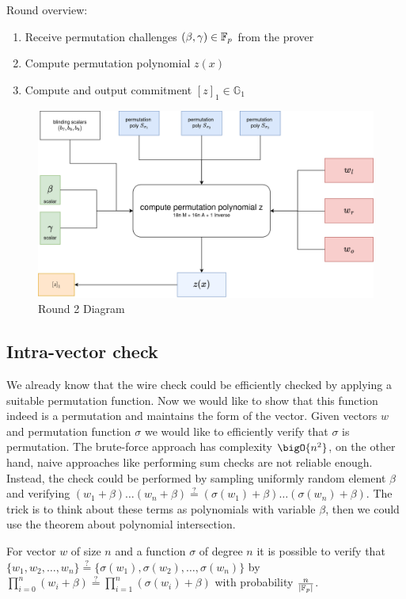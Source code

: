 Round overview:
\begin{enumerate}
    \item Receive permutation challenges $(\beta, \gamma) \in \mathbb{F}_p$ from the prover
    \item Compute permutation polynomial $z(x)$
    \item Compute and output commitment $[z]_1 \in \mathbb{G}_1$
\end{enumerate}

\begin{figure}[H]
    \centering
    \includegraphics[width=1\linewidth]{round-figures/round2/round2.drawio.png}
    \caption{Round 2 Diagram}
    \label{fig:round2}
\end{figure}




\subsection{Intra-vector check}
We already know that the wire check could be efficiently checked by applying a suitable permutation function. Now we would like to show that this function indeed is a permutation and maintains the form of the vector. Given vectors $w$ and permutation function $\sigma$ we would like to efficiently verify that $\sigma$ is permutation. The brute-force approach has complexity $\bigO{n^2}$, on the other hand, naive approaches like performing sum checks are not reliable enough. Instead, the check could be performed by sampling uniformly random element $\beta$ and verifying $(w_1 + \beta)\ldots(w_n + \beta) \stackrel{?}{=} (\sigma(w_1) + \beta)\ldots(\sigma(w_n) + \beta)$. The trick is to think about these terms as polynomials with variable $\beta$, then we could use the theorem about polynomial intersection.

\begin{lemma}
    For vector $w$ of size $n$ and a function $\sigma$ of degree $n$ it is possible to verify that $\{w_1, w_2, \ldots, w_n\} \stackrel{?}{=} \{\sigma(w_1), \sigma(w_2), \ldots, \sigma(w_n) \}$ by $\prod_{i=0}^n (w_i + \beta) \stackrel{?}{=} \prod_{i=1}^n (\sigma(w_i) + \beta)$ with probability $\frac{n}{|\mathbb{F}_p|}$.
\end{lemma}


